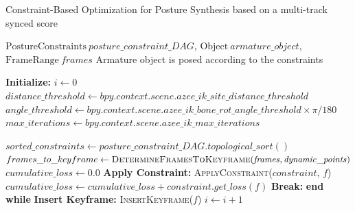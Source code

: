 \documentclass[../../main.tex]{subfiles}
\begin{document}
\begin{algorithm}
    \caption{Constraint-Based Optimization for Posture Synthesis based on a multi-track synced score}
    \label{alg:new_constraint_based_optimization}
    \begin{algorithmic}[1]
        \Require $\text{PostureConstraints} \ \mathit{posture\_constraint\_DAG}$, $\text{Object} \ \mathit{armature\_object}$, $\text{FrameRange} \ \mathit{frames}$
        \Ensure Armature object is posed according to the constraints
        
        \State \textbf{Initialize:} $i \gets 0$
        \State $distance\_threshold \gets \mathit{bpy.context.scene.azee\_ik\_site\_distance\_threshold}$
        \State $angle\_threshold \gets \mathit{bpy.context.scene.azee\_ik\_bone\_rot\_angle\_threshold \times \pi / 180}$
        \State $max\_iterations \gets \mathit{bpy.context.scene.azee\_ik\_max\_iterations}$
        
        \State $\mathit{sorted\_constraints} \gets \mathit{posture\_constraint\_DAG.topological\_sort()}$
        \State $frames\_to\_keyframe \gets \textsc{DetermineFramesToKeyframe}(\mathit{frames}, \mathit{dynamic\_points})$
                \State $\mathit{cumulative\_loss} \gets 0.0$
                    \State \textbf{Apply Constraint:} \textsc{ApplyConstraint}($constraint$, $f$)
                    \State $cumulative\_loss \gets cumulative\_loss + \mathit{constraint.get\_loss(f)}$
                \EndFor
                    \State \textbf{Break:} \textbf{end while}
                \EndIf
                \State \textbf{Insert Keyframe:} \textsc{InsertKeyframe}($f$)
            \EndFor
            \State $i \gets i + 1$
        \EndWhile
        

\end{algorithmic}
\end{algorithm}
\end{document}
